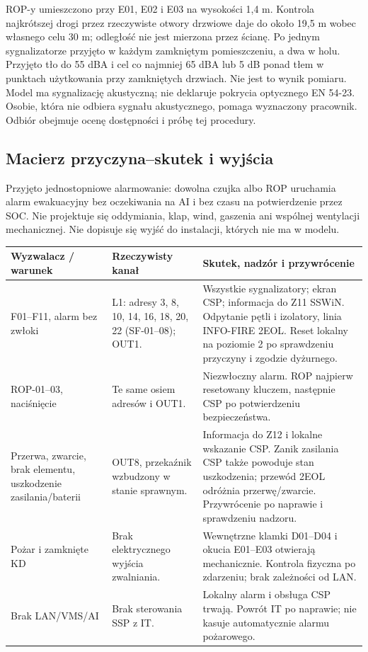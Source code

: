 ROP-y umieszczono przy E01, E02 i E03 na wysokości 1,4 m. Kontrola najkrótszej drogi przez rzeczywiste otwory drzwiowe daje do około 19,5 m wobec własnego celu 30 m; odległość nie jest mierzona przez ścianę. Po jednym sygnalizatorze przyjęto w każdym zamkniętym pomieszczeniu, a dwa w holu. Przyjęto tło do 55 dBA i cel co najmniej 65 dBA lub 5 dB ponad tłem w punktach użytkowania przy zamkniętych drzwiach. Nie jest to wynik pomiaru. Model ma sygnalizację akustyczną; nie deklaruje pokrycia optycznego EN 54-23. Osobie, która nie odbiera sygnału akustycznego, pomaga wyznaczony pracownik. Odbiór obejmuje ocenę dostępności i próbę tej procedury.

\subsection{Macierz przyczyna--skutek i wyjścia}
Przyjęto jednostopniowe alarmowanie: dowolna czujka albo ROP uruchamia alarm ewakuacyjny bez oczekiwania na AI i bez czasu na potwierdzenie przez SOC. Nie projektuje się oddymiania, klap, wind, gaszenia ani wspólnej wentylacji mechanicznej. Nie dopisuje się wyjść do instalacji, których nie ma w modelu.

\begin{tabularx}{\linewidth}{@{}P{29mm}P{38mm}Y@{}}
\toprule Wyzwalacz / warunek & Rzeczywisty kanał & Skutek, nadzór i przywrócenie\\\midrule
F01--F11, alarm bez zwłoki & L1: adresy 3, 8, 10, 14, 16, 18, 20, 22 (SF-01--08); OUT1. & Wszystkie sygnalizatory; ekran CSP; informacja do Z11 SSWiN. Odpytanie pętli i izolatory, linia INFO-FIRE 2EOL. Reset lokalny na poziomie 2 po sprawdzeniu przyczyny i zgodzie dyżurnego.\\
ROP-01--03, naciśnięcie & Te same osiem adresów i OUT1. & Niezwłoczny alarm. ROP najpierw resetowany kluczem, następnie CSP po potwierdzeniu bezpieczeństwa.\\
Przerwa, zwarcie, brak elementu, uszkodzenie zasilania/baterii & OUT8, przekaźnik wzbudzony w stanie sprawnym. & Informacja do Z12 i lokalne wskazanie CSP. Zanik zasilania CSP także powoduje stan uszkodzenia; przewód 2EOL odróżnia przerwę/zwarcie. Przywrócenie po naprawie i sprawdzeniu nadzoru.\\
Pożar i zamknięte KD & Brak elektrycznego wyjścia zwalniania. & Wewnętrzne klamki D01--D04 i okucia E01--E03 otwierają mechanicznie. Kontrola fizyczna po zdarzeniu; brak zależności od LAN.\\
Brak LAN/VMS/AI & Brak sterowania SSP z IT. & Lokalny alarm i obsługa CSP trwają. Powrót IT po naprawie; nie kasuje automatycznie alarmu pożarowego.\\\bottomrule
\end{tabularx}

